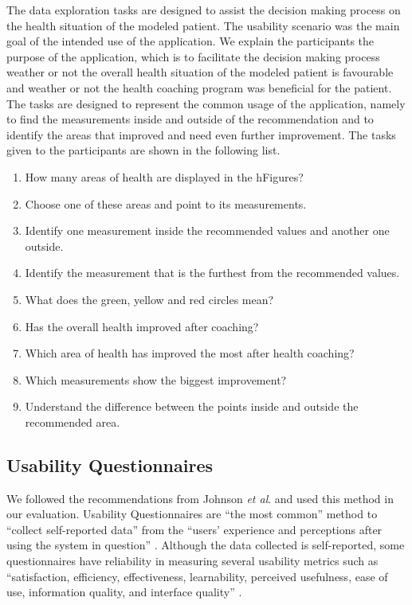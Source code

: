 \documentclass[twocolumn]{bmcart}%
\begin{document}
The data exploration tasks are designed to assist the decision making process on the health situation of the modeled patient. The usability scenario was the main goal of the intended use of the application. We explain the participants the purpose of the application, which is to facilitate the decision making process weather or not the overall health situation of the modeled patient is favourable and weather or not the health coaching program was beneficial for the patient. The tasks are designed to represent the common usage of the application, namely to find the measurements inside and outside of the recommendation and to identify the areas that improved and need even further improvement. The tasks given to the participants are shown in the following list.
\begin{enumerate}
\item How many areas of health are displayed in the hFigures?
\item Choose one of these areas and point to its measurements.
\item Identify one measurement inside the recommended values and another one outside.
\item Identify the measurement that is the furthest from the recommended values.
\item What does the green, yellow and red circles mean?
\item Has the overall health improved after coaching?
\item Which area of health has improved the most after health coaching?
\item Which measurements show the biggest improvement?
\item Understand the difference between the points inside and outside the recommended area.
\end{enumerate}

\subsection*{Usability Questionnaires}

We followed the recommendations from Johnson \textit{et al}. and used this method in our evaluation. Usability Questionnaires are ``the most common'' method to ``collect self-reported data'' from the ``users’ experience and perceptions after using the system in question'' \cite{johnson2011ehr}. Although the data collected is self-reported, some questionnaires have reliability in measuring several usability metrics such as ``satisfaction, efficiency, effectiveness, learnability, perceived usefulness, ease of use, information quality, and interface quality'' \cite{johnson2011ehr}.
\end{document}
